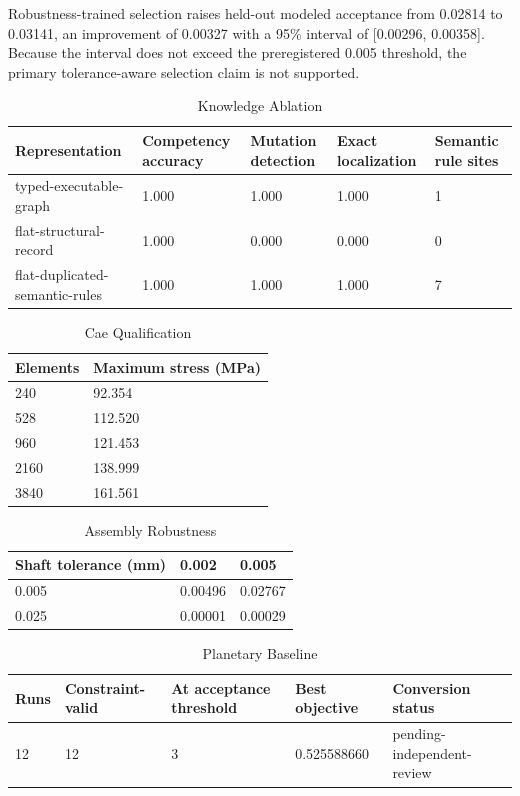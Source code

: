 \documentclass[preprint,12pt]{elsarticle}
\begin{document}
Robustness-trained selection raises held-out modeled acceptance from 0.02814 to 0.03141, an improvement of 0.00327 with a 95\% interval of [0.00296, 0.00358]. Because the interval does not exceed the preregistered 0.005 threshold, the primary tolerance-aware selection claim is not supported.

\begin{table}[htbp]
\centering
\caption{Knowledge Ablation}
\small
\begin{tabular}{lllll}
\textbf{Representation} & \textbf{Competency accuracy} & \textbf{Mutation detection} & \textbf{Exact localization} & \textbf{Semantic rule sites} \\
\hline
typed-executable-graph & 1.000 & 1.000 & 1.000 & 1 \\
flat-structural-record & 1.000 & 0.000 & 0.000 & 0 \\
flat-duplicated-semantic-rules & 1.000 & 1.000 & 1.000 & 7 \\
\end{tabular}
\end{table}
\begin{table}[htbp]
\centering
\caption{Cae Qualification}
\small
\begin{tabular}{ll}
\textbf{Elements} & \textbf{Maximum stress (MPa)} \\
\hline
240 & 92.354 \\
528 & 112.520 \\
960 & 121.453 \\
2160 & 138.999 \\
3840 & 161.561 \\
\end{tabular}
\end{table}
\begin{table}[htbp]
\centering
\caption{Assembly Robustness}
\small
\begin{tabular}{lll}
\textbf{Shaft tolerance (mm)} & \textbf{0.002} & \textbf{0.005} \\
\hline
0.005 & 0.00496 & 0.02767 \\
0.025 & 0.00001 & 0.00029 \\
\end{tabular}
\end{table}
\begin{table}[htbp]
\centering
\caption{Planetary Baseline}
\small
\begin{tabular}{lllll}
\textbf{Runs} & \textbf{Constraint-valid} & \textbf{At acceptance threshold} & \textbf{Best objective} & \textbf{Conversion status} \\
\hline
12 & 12 & 3 & 0.525588660 & pending-independent-review \\
\end{tabular}
\end{table}
\end{document}

